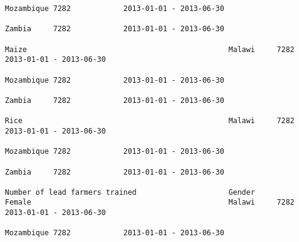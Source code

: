 \documentclass[11pt]{article}
\begin{document}
\begin{Verbatim}[commandchars=\\\{\}]
                                                                                                                                                                                                                 Mozambique 7282            2013-01-01 - 2013-06-30   
                                                                                                                                                                                                                 Zambia     7282            2013-01-01 - 2013-06-30   
                                                                                                                                                              Maize                                              Malawi     7282            2013-01-01 - 2013-06-30   
                                                                                                                                                                                                                 Mozambique 7282            2013-01-01 - 2013-06-30   
                                                                                                                                                                                                                 Zambia     7282            2013-01-01 - 2013-06-30   
                                                                                                                                                              Rice                                               Malawi     7282            2013-01-01 - 2013-06-30   
                                                                                                                                                                                                                 Mozambique 7282            2013-01-01 - 2013-06-30   
                                                                                                                                                                                                                 Zambia     7282            2013-01-01 - 2013-06-30   
                                                                         Number of lead farmers trained                     Gender                            Female                                             Malawi     7282            2013-01-01 - 2013-06-30   
                                                                                                                                                                                                                 Mozambique 7282            2013-01-01 - 2013-06-30   

\end{Verbatim}
\end{document}
